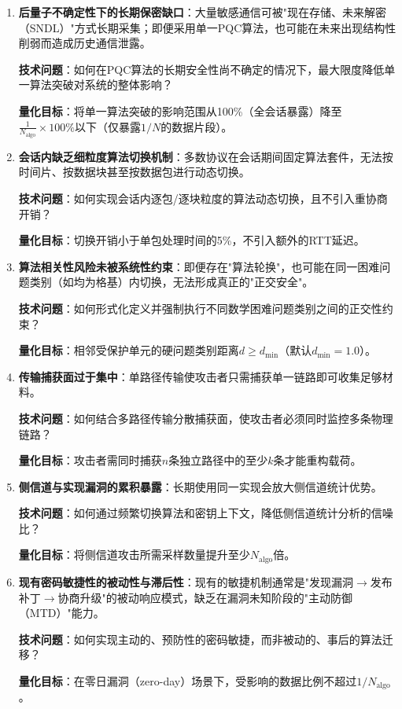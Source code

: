 ﻿\documentclass[12pt,a4paper]{article}
\begin{document}
\begin{enumerate}[label=(\arabic*)]
    \item \textbf{后量子不确定性下的长期保密缺口}：大量敏感通信可被"现在存储、未来解密（SNDL）"方式长期采集；即便采用单一PQC算法，也可能在未来出现结构性削弱而造成历史通信泄露。

    \textbf{技术问题}：如何在PQC算法的长期安全性尚不确定的情况下，最大限度降低单一算法突破对系统的整体影响？

    \textbf{量化目标}：将单一算法突破的影响范围从100\%（全会话暴露）降至$\frac{1}{N_{\text{algo}}} \times 100\%$以下（仅暴露$1/N$的数据片段）。

    \item \textbf{会话内缺乏细粒度算法切换机制}：多数协议在会话期间固定算法套件，无法按时间片、按数据块甚至按数据包进行动态切换。

    \textbf{技术问题}：如何实现会话内逐包/逐块粒度的算法动态切换，且不引入重协商开销？

    \textbf{量化目标}：切换开销小于单包处理时间的5\%，不引入额外的RTT延迟。

    \item \textbf{算法相关性风险未被系统性约束}：即便存在"算法轮换"，也可能在同一困难问题类别（如均为格基）内切换，无法形成真正的"正交安全"。

    \textbf{技术问题}：如何形式化定义并强制执行不同数学困难问题类别之间的正交性约束？

    \textbf{量化目标}：相邻受保护单元的硬问题类别距离$d \geq d_{\min}$（默认$d_{\min} = 1.0$）。

    \item \textbf{传输捕获面过于集中}：单路径传输使攻击者只需捕获单一链路即可收集足够材料。

    \textbf{技术问题}：如何结合多路径传输分散捕获面，使攻击者必须同时监控多条物理链路？

    \textbf{量化目标}：攻击者需同时捕获$n$条独立路径中的至少$k$条才能重构载荷。

    \item \textbf{侧信道与实现漏洞的累积暴露}：长期使用同一实现会放大侧信道统计优势。

    \textbf{技术问题}：如何通过频繁切换算法和密钥上下文，降低侧信道统计分析的信噪比？

    \textbf{量化目标}：将侧信道攻击所需采样数量提升至少$N_{\text{algo}}$倍。

    \item \textbf{现有密码敏捷性的被动性与滞后性}：现有的敏捷机制通常是"发现漏洞$\to$发布补丁$\to$协商升级"的被动响应模式，缺乏在漏洞未知阶段的"主动防御（MTD）"能力。

    \textbf{技术问题}：如何实现主动的、预防性的密码敏捷，而非被动的、事后的算法迁移？

    \textbf{量化目标}：在零日漏洞（zero-day）场景下，受影响的数据比例不超过$1/N_{\text{algo}}$。
\end{enumerate}
\end{document}
